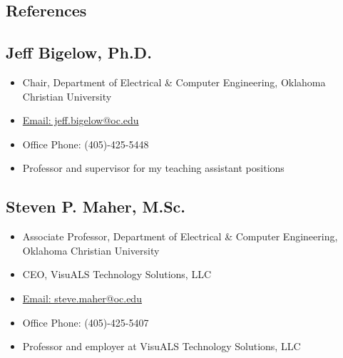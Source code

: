 \documentclass{article}
\begin{document}
\begin{spacing}{.5}
\begin{comment}
	\subsection{RGB Laser Scanner Controller}
		\begin{itemize}[label=--,itemsep=-.35ex]
			\item \large{}
		\end{itemize}
\end{comment}

\section{References}
	\subsection{Jeff Bigelow, Ph.D.}
		\begin{itemize}[label=--,itemsep=-.35ex]
			\item \large{Chair, Department of Electrical \& Computer Engineering, Oklahoma Christian University}
			\item \large{\href{mailto::jeff.bigelow@oc.edu}{\large{Email: jeff.bigelow@oc.edu}}}
			\item \large{Office Phone: (405)-425-5448}
			\item \large{Professor and supervisor for my teaching assistant positions}
		\end{itemize}
	\subsection{Steven P. Maher, M.Sc.}
		\begin{itemize}[label=--,itemsep=-.35ex]
			\item \large{Associate Professor, Department of Electrical \& Computer Engineering, Oklahoma Christian University}
			\item \large{CEO, VisuALS Technology Solutions, LLC}
			\item \large{\href{mailto::steve.maher@oc.edu}{\large{Email: steve.maher@oc.edu}}}
			\item \large{Office Phone: (405)-425-5407}
			\item \large{Professor and employer at VisuALS Technology Solutions, LLC}
		\end{itemize}

\end{spacing}
\end{document}

